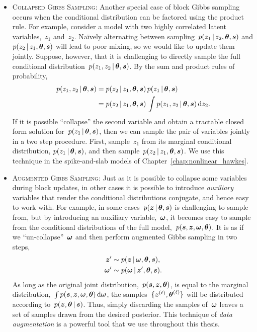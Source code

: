 \begin{itemize}
\item \textsc{Collapsed Gibbs Sampling}: Another special case of block
  Gibbs sampling occurs when the conditional distribution can be
  factored using the product rule. For example, consider a model with
  two highly correlated latent variables,~$z_1$ and~$z_2$.  Na\"ively
  alternating between sampling~${p(z_1 \,|\, z_2, \boldsymbol{\theta}, \boldsymbol{s})}$ and
  ${p(z_2 \,|\, z_1, \boldsymbol{\theta}, \boldsymbol{s})}$ will lead to poor mixing, so we
  would like to update them jointly.  Suppose, however, that it is
  challenging to directly sample the full conditional
  distribution~$p(z_1, z_2 \,|\, \boldsymbol{\theta}, \boldsymbol{s})$. By the sum and product rules
  of probability,
  \begin{align*}
    p(z_1, z_2 \,|\, \boldsymbol{\theta}, \boldsymbol{s}) 
    &= p(z_2 \,|\, z_1, \boldsymbol{\theta}, \boldsymbol{s}) \, 
      p(z_1 \,|\, \boldsymbol{\theta}, \boldsymbol{s}) \\
    &= p(z_2 \,|\, z_1, \boldsymbol{\theta}, \boldsymbol{s}) \, 
      \int p(z_1, z_2 \,|\, \boldsymbol{\theta}, \boldsymbol{s}) \, \mathrm{d}z_2.
  \end{align*}
  If it is possible ``collapse'' the second variable and obtain a
  tractable closed form solution for~$p(z_1 \,|\, \boldsymbol{\theta}, \boldsymbol{s})$,
  then we can sample the pair of variables jointly in a two step
  procedure. First, sample~$z_1$ from its marginal conditional
  distribution, $p(z_1 \,|\, \boldsymbol{\theta}, \boldsymbol{s})$, and then
  sample~${p(z_2 \,|\, z_1, \boldsymbol{\theta}, \boldsymbol{s})}$. We use this technique 
  in the spike-and-slab models of Chapter~\ref{chap:nonlinear_hawkes}.
  
\item \textsc{Augmented Gibbs Sampling}: Just as it is possible to
  collapse some variables during block updates, in other cases it is
  possible to introduce \emph{auxiliary} variables that render the
  conditional distributions conjugate, and hence easy to work
  with. For example, in some cases~$p(\boldsymbol{z} \,|\, \boldsymbol{\theta}, \boldsymbol{s})$ is
  challenging to sample from, but by introducing an auxiliary
  variable,~$\boldsymbol{\omega}$, it becomes easy to sample from the conditional
  distributions of the full model,~$p(\boldsymbol{s}, \boldsymbol{z}, \boldsymbol{\omega}, \boldsymbol{\theta})$.
  It is as if we ``un-collapse''~$\boldsymbol{\omega}$
  and then perform augmented Gibbs sampling in two steps,
  \begin{align*}
    \boldsymbol{z}' &\sim p(\boldsymbol{z} \,|\, \boldsymbol{\omega}, \boldsymbol{\theta}, \boldsymbol{s}), \\
    \boldsymbol{\omega}' &\sim p(\boldsymbol{\omega} \,|\, \boldsymbol{z}', \boldsymbol{\theta}, \boldsymbol{s}).
  \end{align*}
  As long as the original joint distribution,~$p(\boldsymbol{s}, \boldsymbol{z}, \boldsymbol{\theta})$,
  is equal to the marginal distribution,~${\int p(\boldsymbol{s}, \boldsymbol{z}, \boldsymbol{\omega},
    \boldsymbol{\theta}) \, \mathrm{d}\boldsymbol{\omega}}$, the samples~${\{\boldsymbol{z}^{(\ell)},
    \boldsymbol{\theta}^{(\ell)}\}}$ will be distributed according to~$p(\boldsymbol{z},
  \boldsymbol{\theta} \,|\, \boldsymbol{s})$.  Thus, simply discarding the samples
  of~$\boldsymbol{\omega}$ leaves a set of samples drawn from the desired
  posterior.  This technique of \emph{data augmentation} is a powerful
  tool that we use throughout this thesis.
\end{itemize}



